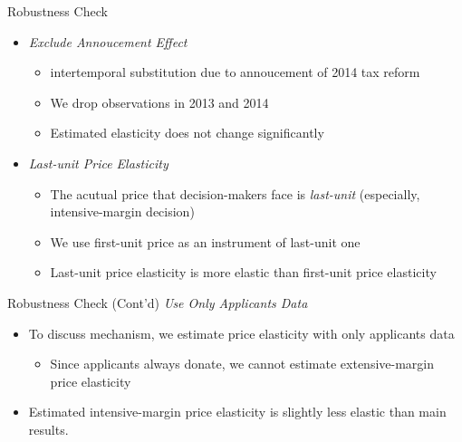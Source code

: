 \documentclass[
  ignorenonframetext,
  aspectratio=169,
]{beamer}
\providecommand{\tightlist}{%
  \setlength{\itemsep}{0pt}\setlength{\parskip}{0pt}}
\begin{document}
\begin{frame}{Robustness Check}
\protect\hypertarget{robustness-check}{}
\begin{itemize}
\tightlist
\item
  \emph{Exclude Annoucement Effect}

  \begin{itemize}
  \tightlist
  \item
    intertemporal substitution due to annoucement of 2014 tax reform
  \item
    We drop observations in 2013 and 2014
  \item
    Estimated elasticity does not change significantly
  \end{itemize}
\item
  \emph{Last-unit Price Elasticity}

  \begin{itemize}
  \tightlist
  \item
    The acutual price that decision-makers face is \emph{last-unit}
    (especially, intensive-margin decision)
  \item
    We use first-unit price as an instrument of last-unit one
  \item
    Last-unit price elasticity is more elastic
    than first-unit price elasticity
  \end{itemize}
\end{itemize}
\end{frame}

\begin{frame}{Robustness Check (Cont'd)}
\protect\hypertarget{robustness-check-contd}{}
\emph{Use Only Applicants Data}

\begin{itemize}
\tightlist
\item
  To discuss mechanism,
  we estimate price elasticity with only applicants data

  \begin{itemize}
  \tightlist
  \item
    Since applicants always donate,
    we cannot estimate extensive-margin price elasticity
  \end{itemize}
\item
  Estimated intensive-margin price elasticity
  is slightly less elastic than main results.
\end{itemize}
\end{frame}
\end{document}
